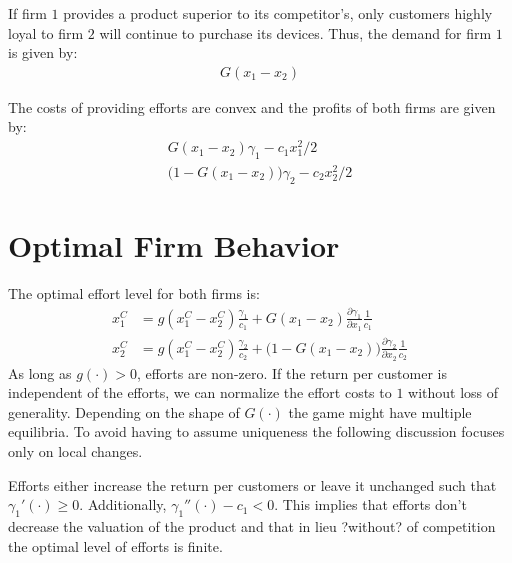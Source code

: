 \documentclass[a4paper, 11pt]{article}
\begin{document}
If firm $1$ provides a product superior to its competitor's, only customers highly loyal to firm $2$ will continue to purchase its devices. Thus, the demand for firm $1$ is given by:
\begin{align*}
G(x_1-x_2)
\end{align*}

The costs of providing efforts are convex and the profits of both firms are given by:
\begin{align}
G(x_1-x_2)\gamma_1 - c_1x_1^2/2\\
\big(1-G(x_1-x_2)\big)\gamma_2 - c_2x_2^2/2
\end{align}

\section{Optimal Firm Behavior}

The optimal effort level for both firms is:
\begin{align}
x_1^C &= g(x_1^C-x_2^C)\frac{\gamma_1}{c_1} + G(x_1-x_2)\frac{\partial \gamma_1}{\partial x_1}\frac{1}{c_1}\\
x_2^C &= g(x_1^C-x_2^C)\frac{\gamma_2}{c_2} + \big(1-G(x_1-x_2)\big)\frac{\partial \gamma_2}{\partial x_2}\frac{1}{c_2}
\end{align}
As long as $g(\cdot)>0$, efforts are non-zero. If the return per customer is independent of the efforts, we can normalize the effort costs to $1$ without loss of generality. Depending on the shape of $G(\cdot)$ the game might have multiple equilibria. To avoid having to assume uniqueness the following discussion focuses only on local changes. 

Efforts either increase the return per customers or leave it unchanged such that $\gamma_1'(\cdot)\geq 0$. Additionally, $\gamma_1''(\cdot) - c_1<0$. This implies that efforts don't decrease the valuation of the product and that in lieu ?without? of competition the optimal level of efforts is finite.
\end{document}
